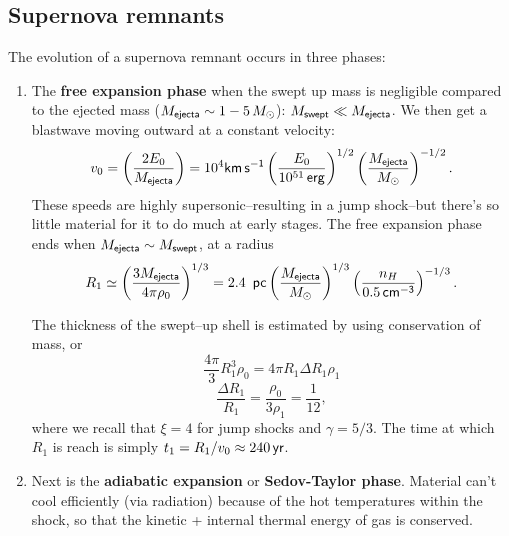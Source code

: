 \documentclass{tufte-handout}
\renewcommand{\textbf}[1]{{\bf \textcolor{dark-gray}{#1}}}
\renewcommand{\rm}{\sf}
\renewcommand{\textrm}{\textsf}
\begin{document}
\subsection{Supernova remnants}
The evolution of a supernova remnant occurs in three phases:
\begin{enumerate}
\item The \textbf{free expansion phase} when the swept up mass is negligible compared to the ejected mass ($M_{\rm ejecta} \sim 1-5\,M_\odot$): $M_{\rm swept} \ll M_{\rm ejecta}$. We then get a blastwave moving outward at a constant velocity:
\[v_0 = \left (\frac{2E_0}{M_{\rm ejecta}}\right ) = 10^4 {\rm km\, s^{-1}}\left (\frac{E_0}{10^{51}\,\rm erg}\right )^{1/2}\left (\frac{M_{\rm ejecta}}{M_\odot}\right )^{-1/2}.\]
These speeds are highly supersonic--resulting in a jump shock--but there's so little material for it to do much at early stages. The free expansion phase ends when $M_{\rm ejecta} \sim M_{\rm swept}$, at a radius
\[R_1 \simeq \left (\frac{3M_{\rm ejecta}}{4\pi \rho_0}\right )^{1/3} = 2.4 \textrm{\, pc} \left (\frac{M_{\rm ejecta}}{M_\odot}\right )^{1/3}\left (\frac{n_H}{0.5\, \rm cm^{-3}}\right )^{-1/3}.\]

The thickness of the swept--up shell is estimated by using conservation of mass, or
\[\frac{4\pi}{3}R_1^3 \rho_0 = 4\pi R_1 \Delta R_1 \rho_1\]
\[\frac{\Delta R_1}{R_1} = \frac{\rho_0}{3\rho_1} = \frac{1}{12},\]
where we recall that $\xi=4$ for jump shocks and $\gamma = 5/3$. The time at which $R_1$ is reach is simply $t_1 = R_1/v_0 \approx 240 {\,\rm yr}$.

\item Next is the \textbf{adiabatic expansion} or \textbf{Sedov-Taylor phase}. Material can't cool efficiently (via radiation) because of the hot temperatures within the shock, so that the kinetic + internal thermal energy of gas is conserved.


\end{enumerate}
\end{document}
